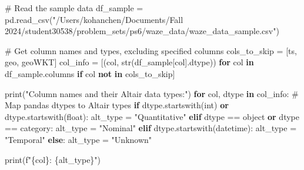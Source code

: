\documentclass[
  letterpaper,
  DIV=11,
  numbers=noendperiod]{scrartcl}
\newenvironment{Shaded}{\begin{snugshade}}{\end{snugshade}}
\newcommand{\BuiltInTok}[1]{\textcolor[rgb]{0.00,0.23,0.31}{#1}}
\newcommand{\CommentTok}[1]{\textcolor[rgb]{0.37,0.37,0.37}{#1}}
\newcommand{\ControlFlowTok}[1]{\textcolor[rgb]{0.00,0.23,0.31}{\textbf{#1}}}
\newcommand{\KeywordTok}[1]{\textcolor[rgb]{0.00,0.23,0.31}{\textbf{#1}}}
\newcommand{\NormalTok}[1]{\textcolor[rgb]{0.00,0.23,0.31}{#1}}
\newcommand{\OperatorTok}[1]{\textcolor[rgb]{0.37,0.37,0.37}{#1}}
\newcommand{\SpecialCharTok}[1]{\textcolor[rgb]{0.37,0.37,0.37}{#1}}
\newcommand{\SpecialStringTok}[1]{\textcolor[rgb]{0.13,0.47,0.30}{#1}}
\newcommand{\StringTok}[1]{\textcolor[rgb]{0.13,0.47,0.30}{#1}}
\begin{document}
\begin{Shaded}
\begin{Highlighting}[]
\CommentTok{\# Read the sample data}
\NormalTok{df\_sample }\OperatorTok{=}\NormalTok{ pd.read\_csv(}\StringTok{"/Users/kohanchen/Documents/Fall 2024/student30538/problem\_sets/ps6/waze\_data/waze\_data\_sample.csv"}\NormalTok{)}

\CommentTok{\# Get column names and types, excluding specified columns}
\NormalTok{cols\_to\_skip }\OperatorTok{=}\NormalTok{ [}\StringTok{\textquotesingle{}ts\textquotesingle{}}\NormalTok{, }\StringTok{\textquotesingle{}geo\textquotesingle{}}\NormalTok{, }\StringTok{\textquotesingle{}geoWKT\textquotesingle{}}\NormalTok{]}
\NormalTok{col\_info }\OperatorTok{=}\NormalTok{ [(col, }\BuiltInTok{str}\NormalTok{(df\_sample[col].dtype)) }\ControlFlowTok{for}\NormalTok{ col }\KeywordTok{in}\NormalTok{ df\_sample.columns }\ControlFlowTok{if}\NormalTok{ col }\KeywordTok{not} \KeywordTok{in}\NormalTok{ cols\_to\_skip]}

\BuiltInTok{print}\NormalTok{(}\StringTok{"Column names and their Altair data types:"}\NormalTok{)}
\ControlFlowTok{for}\NormalTok{ col, dtype }\KeywordTok{in}\NormalTok{ col\_info:}
    \CommentTok{\# Map pandas dtypes to Altair types}
    \ControlFlowTok{if}\NormalTok{ dtype.startswith(}\StringTok{\textquotesingle{}int\textquotesingle{}}\NormalTok{) }\KeywordTok{or}\NormalTok{ dtype.startswith(}\StringTok{\textquotesingle{}float\textquotesingle{}}\NormalTok{):}
\NormalTok{        alt\_type }\OperatorTok{=} \StringTok{"Quantitative"}
    \ControlFlowTok{elif}\NormalTok{ dtype }\OperatorTok{==} \StringTok{\textquotesingle{}object\textquotesingle{}} \KeywordTok{or}\NormalTok{ dtype }\OperatorTok{==} \StringTok{\textquotesingle{}category\textquotesingle{}}\NormalTok{:}
\NormalTok{        alt\_type }\OperatorTok{=} \StringTok{"Nominal"}
    \ControlFlowTok{elif}\NormalTok{ dtype.startswith(}\StringTok{\textquotesingle{}datetime\textquotesingle{}}\NormalTok{):}
\NormalTok{        alt\_type }\OperatorTok{=} \StringTok{"Temporal"}
    \ControlFlowTok{else}\NormalTok{:}
\NormalTok{        alt\_type }\OperatorTok{=} \StringTok{"Unknown"}
        
    \BuiltInTok{print}\NormalTok{(}\SpecialStringTok{f"}\SpecialCharTok{\{}\NormalTok{col}\SpecialCharTok{\}}\SpecialStringTok{: }\SpecialCharTok{\{}\NormalTok{alt\_type}\SpecialCharTok{\}}\SpecialStringTok{"}\NormalTok{)}
\end{Highlighting}
\end{Shaded}
\end{document}
